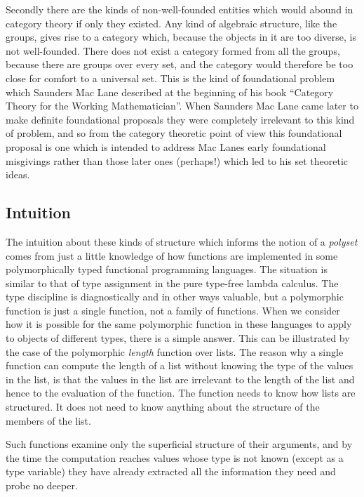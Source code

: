 \documentclass[numreferences]{rbjk}
\begin{document}
\begin{article}
Secondly there are the kinds of non-well-founded entities which would abound in category theory if only they existed.
Any kind of algebraic structure, like the groups, gives rise to a category which, because the objects in it are too diverse, is not well-founded.
There does not exist a category formed from all the groups, because there are groups over every set, and the category would therefore be too close for comfort to a universal set.
This is the kind of foundational problem which Saunders Mac Lane described at the beginning of his book ``Category Theory for the Working Mathematician''.
When Saunders Mac Lane came later to make definite foundational proposals they were completely irrelevant to this kind of problem, and so from the category theoretic point of view this foundational proposal is one which is intended to address Mac Lanes early foundational misgivings rather than those later ones (perhaps!) which led to his set theoretic ideas.

\subsection{Intuition}

The intuition about these kinds of structure which informs the notion of a \emph{polyset} comes from just a little knowledge of how functions are implemented in some polymorphically typed functional programming languages.
The situation is similar to that of type assignment in the pure type-free lambda calculus.
The type discipline is diagnostically and in other ways valuable, but a polymorphic function is just a single function, not a family of functions.
When we consider how it is possible for the same polymorphic function in these languages to apply to objects of different types, there is a simple answer.
This can be illustrated by the case of the polymorphic \emph{length} function over lists.
The reason why a single function can compute the length of a list without knowing the type of the values in the list, is that the values in the list are irrelevant to the length of the list and hence to the evaluation of the function.
The function needs to know how lists are structured.
It does not need to know anything about the structure of the members of the list.

Such functions examine only the superficial structure of their arguments, and by the time the computation reaches values whose type is not known (except as a type variable) they have already extracted all the information they need and probe no deeper.


\end{article}
\end{document}
